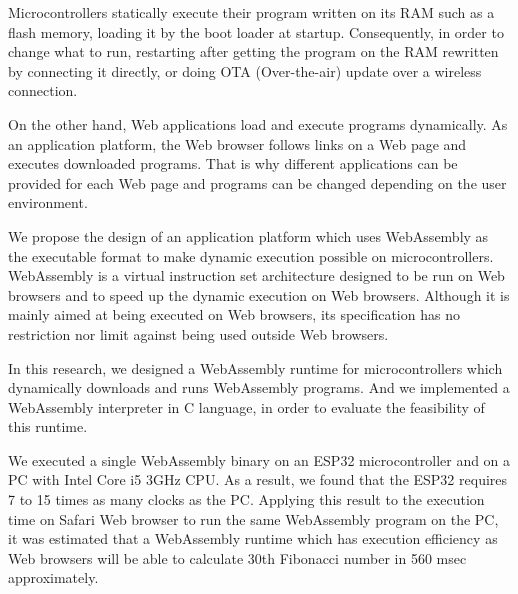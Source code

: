\begin{eabstract}

  Microcontrollers statically execute their program written on its RAM such as a flash memory, loading it by the boot loader at startup.
  Consequently, in order to change what to run, restarting after getting the program on the RAM rewritten by connecting it directly, or doing OTA (Over-the-air) update over a wireless connection.

  On the other hand, Web applications load and execute programs dynamically.
  As an application platform, the Web browser follows links on a Web page and executes downloaded programs.
  That is why different applications can be provided for each Web page and programs can be changed depending on the user environment.

  We propose the design of an application platform which uses WebAssembly as the executable format to make dynamic execution possible on microcontrollers.
  WebAssembly is a virtual instruction set architecture designed to be run on Web browsers and to speed up the dynamic execution on Web browsers.
  Although it is mainly aimed at being executed on Web browsers, its specification has no restriction nor limit against being used outside Web browsers.

  In this research, we designed a WebAssembly runtime for microcontrollers which dynamically downloads and runs WebAssembly programs.
  And we implemented a WebAssembly interpreter in C language, in order to evaluate the feasibility of this runtime.

  We executed a single WebAssembly binary on an ESP32 microcontroller and on a PC with Intel Core i5 3GHz CPU.
  As a result, we found that the ESP32 requires 7 to 15 times as many clocks as the PC.
  Applying this result to the execution time on Safari Web browser to run the same WebAssembly program on the PC, it was estimated that a WebAssembly runtime which has execution efficiency as Web browsers will be able to calculate 30th Fibonacci number in 560 msec approximately.

\end{eabstract}
